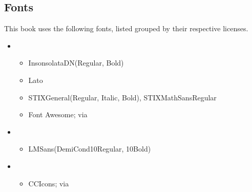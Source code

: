 \subsection{Fonts}
\label{\detokenize{licenses:fonts}}
\sphinxAtStartPar
This book uses the following fonts, listed grouped by their respective licenses.
\begin{itemize}
\item {} 
\sphinxAtStartPar
{}
\begin{itemize}
\item {} 
\sphinxAtStartPar
InsonsolataDN\sphinxhyphen{}(Regular, Bold)

\item {} 
\sphinxAtStartPar
Lato

\item {} 
\sphinxAtStartPar
STIXGeneral\sphinxhyphen{}(Regular, Italic, Bold), STIXMathSans\sphinxhyphen{}Regular

\item {} 
\sphinxAtStartPar
Font Awesome; via 

\end{itemize}

\item {} 
\sphinxAtStartPar
{}
\begin{itemize}
\item {} 
\sphinxAtStartPar
LMSans(DemiCond10\sphinxhyphen{}Regular, 10\sphinxhyphen{}Bold)

\end{itemize}

\item {} 
\sphinxAtStartPar
{}
\begin{itemize}
\item {} 
\sphinxAtStartPar
CCIcons; via 

\end{itemize}

\end{itemize}


